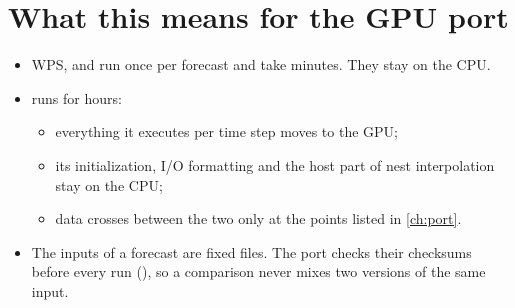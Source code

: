\section{What this means for the GPU port}

\begin{itemize}
  \item WPS,  and  run once per forecast and take minutes. They stay on the CPU.
  \item {} runs for hours:
    \begin{itemize}
      \item everything it executes per time step moves to the GPU;
      \item its initialization, I/O formatting and the host part of nest interpolation stay on the CPU;
      \item data crosses between the two only at the points listed in \cref{ch:port}.
    \end{itemize}
  \item The inputs of a forecast are fixed files. The port checks their checksums before every run
    (), so a comparison never mixes two versions of the same input.
\end{itemize}
